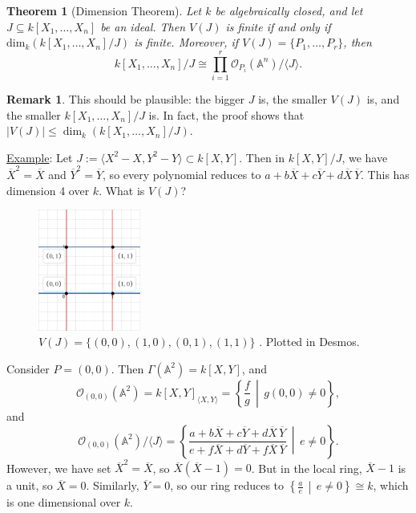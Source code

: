 \documentclass[12pt]{article}
\newcommand{\vbrack}[1]{\langle #1\rangle}
\newtheorem{theorem}{Theorem}[section]
\theoremstyle{definition}
\newtheorem*{remark}{Remark}
\begin{document}
\begin{theorem}[Dimension Theorem]
    Let $k$ be algebraically closed, and let $J\subseteq k[X_1,\dotsc,X_n]$ be an ideal. Then $V(J)$ is finite if and only if $\mathrm{dim}_k(k[X_1,\dotsc,X_n]/J)$ is finite. Moreover, if $V(J)=\{P_1,\dotsc,P_r\}$, then
    \begin{equation}
        k[X_1,\dotsc,X_n]/J\cong\prod\limits_{i=1}^r\mathcal{O}_{P_i}(\mathbb{A}^n)/\vbrack{J}.
    \end{equation}
\end{theorem}
\begin{remark}
   This should be plausible: the bigger $J$ is, the smaller $V(J)$ is, and the smaller $k[X_1,\dotsc,X_n]/J$ is. In fact, the proof shows that $|V(J)|\leq\dim_k(k[X_1,\dotsc,X_n]/J)$.
\end{remark}
\underline{Example}: Let $J:=\vbrack{X^2-X,Y^2-Y}\subset k[X,Y]$. Then in $k[X,Y]/J$, we have $\overline{X}^2=\overline{X}$ and $\overline{Y}^2=\overline{Y}$, so every polynomial reduces to $a+b\overline{X}+c\overline{Y}+d\overline{X}\,\overline{Y}$. This has dimension 4 over $k$. What is $V(J)$?
\begin{figure}[H]
    \centering
    \includegraphics[width=0.3\textwidth]{16.png}
    \caption{$V(J)=\{(0,0),(1,0),(0,1),(1,1)\}$ . Plotted in Desmos.}
\end{figure}
Consider $P=(0,0)$. Then $\Gamma(\mathbb{A}^2)=k[X,Y]$, and
\[\mathcal{O}_{(0,0)}(\mathbb{A}^2)=k[X,Y]_{\vbrack{X,Y}}=\left\{\frac{f}{g}\,\middle|\,g(0,0)\neq0\right\},\]
and
\[\mathcal{O}_{(0,0)}(\mathbb{A}^2)/\vbrack{J}=\left\{\frac{a+b\overline{X}+c\overline{Y}+d\overline{X}\,\overline{Y}}{e+f\overline{X}+d\overline{Y}+f\overline{X}\,\overline{Y}}\,\middle|\,e\neq0\right\}.\]
However, we have set $\overline{X}^2=\overline{X}$, so $\overline{X}(\overline{X}-1)=0$. But in the local ring, $\overline{X}-1$ is a unit, so $\overline{X}=0$. Similarly, $\overline{Y}=0$, so our ring reduces to $\left\{\frac{a}{e}\,\middle|\,e\neq0\right\}\cong k$, which is one dimensional over $k$.
\end{document}
